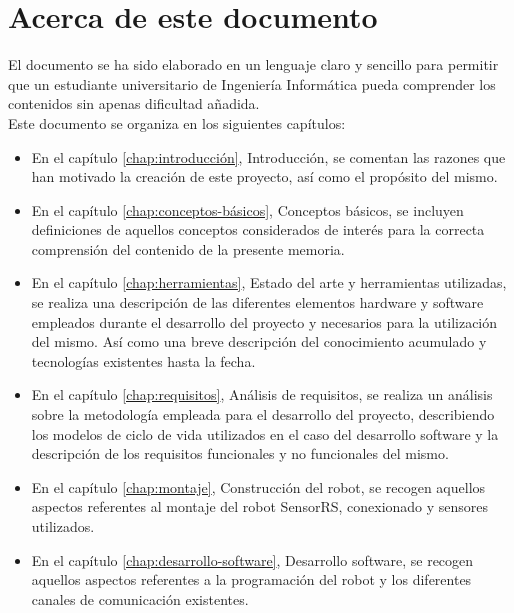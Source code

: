 \section{Acerca de este documento}

El documento se ha sido elaborado en un lenguaje claro y sencillo para permitir que un estudiante universitario de Ingeniería Informática pueda comprender los contenidos sin apenas dificultad añadida.\\

Este documento se organiza en los siguientes capítulos:\\

\begin{itemize}

\item En el capítulo \ref{chap:introducción}, Introducción, se comentan las razones que han motivado la creación de este proyecto, así como el propósito del mismo.

\item En el capítulo \ref{chap:conceptos-básicos}, Conceptos básicos, se incluyen definiciones de aquellos conceptos considerados de interés para la correcta comprensión del contenido de la presente memoria.

\item En el capítulo \ref{chap:herramientas}, Estado del arte y herramientas utilizadas, se realiza una descripción de las diferentes elementos hardware y software empleados durante el desarrollo del proyecto y necesarios para la utilización del mismo. Así como una breve descripción del conocimiento acumulado y tecnologías existentes hasta la fecha.

\item En el capítulo \ref{chap:requisitos}, Análisis de requisitos, se realiza un análisis sobre la metodología empleada para el desarrollo del proyecto, describiendo
los modelos de ciclo de vida utilizados en el caso del desarrollo software y la descripción de los requisitos funcionales y no funcionales del mismo.

\item En el capítulo \ref{chap:montaje}, Construcción del robot, se recogen aquellos aspectos referentes al montaje del robot SensorRS, conexionado y sensores utilizados. 

\item En el capítulo \ref{chap:desarrollo-software}, Desarrollo software, se recogen aquellos aspectos referentes a la programación del robot y los diferentes canales de comunicación existentes.


\end{itemize}
